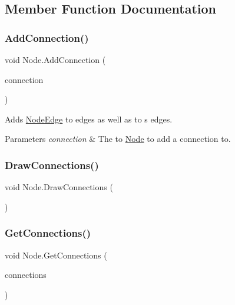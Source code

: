 \subsection{Member Function Documentation}
\mbox{\label{class_node_adaf109cc39cf2444181ea55985767cee}} 
\subsubsection{\texorpdfstring{Add\+Connection()}{AddConnection()}}
{\footnotesize\ttfamily void Node.\+Add\+Connection (\begin{DoxyParamCaption}\item[{\mbox{\hyperlink{class_node}{Node}}}]{connection }\end{DoxyParamCaption})}



Adds \mbox{\hyperlink{class_node_edge}{Node\+Edge}} to edges as well as to \textquotesingle{}s edges. 


\begin{DoxyParams}{Parameters}
{\em connection} & The \textquotesingle{}to\textquotesingle{} \mbox{\hyperlink{class_node}{Node}} to add a connection to. \\
\hline
\end{DoxyParams}
\mbox{\label{class_node_ada2f9aee327ffd50e46684303411b2a8}} 
\subsubsection{\texorpdfstring{Draw\+Connections()}{DrawConnections()}}
{\footnotesize\ttfamily void Node.\+Draw\+Connections (\begin{DoxyParamCaption}{ }\end{DoxyParamCaption})}

\mbox{\label{class_node_a0a14a3bf53ab9b4939fa6518d1fa4278}} 
\subsubsection{\texorpdfstring{Get\+Connections()}{GetConnections()}}
{\footnotesize\ttfamily void Node.\+Get\+Connections (\begin{DoxyParamCaption}\item[{out List$<$ \mbox{\hyperlink{interface_i_connection}{I\+Connection}}$<$ \mbox{\hyperlink{class_node}{Node}} $>$$>$}]{connections }\end{DoxyParamCaption})}


